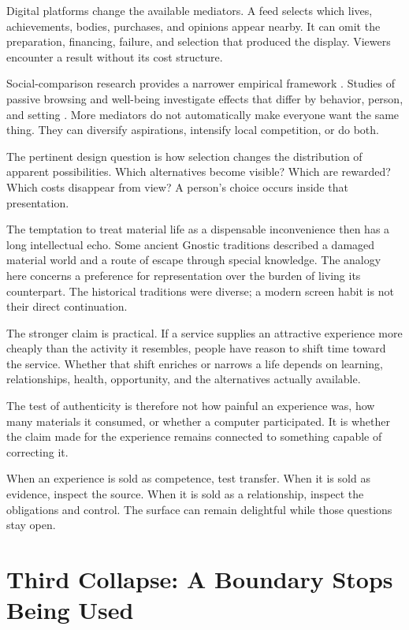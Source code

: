 \documentclass[11pt,openany]{book}
\begin{document}
Digital platforms change the available mediators. A feed selects which lives, achievements, bodies, purchases, and opinions appear nearby. It can omit the preparation, financing, failure, and selection that produced the display. Viewers encounter a result without its cost structure.

Social-comparison research provides a narrower empirical framework \cite{festinger1954theory}. Studies of passive browsing and well-being investigate effects that differ by behavior, person, and setting \cite{verduyn2015passive}. More mediators do not automatically make everyone want the same thing. They can diversify aspirations, intensify local competition, or do both.

The pertinent design question is how selection changes the distribution of apparent possibilities. Which alternatives become visible? Which are rewarded? Which costs disappear from view? A person's choice occurs inside that presentation.

The temptation to treat material life as a dispensable inconvenience then has a long intellectual echo. Some ancient Gnostic traditions described a damaged material world and a route of escape through special knowledge. The analogy here concerns a preference for representation over the burden of living its counterpart. The historical traditions were diverse; a modern screen habit is not their direct continuation.

The stronger claim is practical. If a service supplies an attractive experience more cheaply than the activity it resembles, people have reason to shift time toward the service. Whether that shift enriches or narrows a life depends on learning, relationships, health, opportunity, and the alternatives actually available.

The test of authenticity is therefore not how painful an experience was, how many materials it consumed, or whether a computer participated. It is whether the claim made for the experience remains connected to something capable of correcting it.

When an experience is sold as competence, test transfer. When it is sold as evidence, inspect the source. When it is sold as a relationship, inspect the obligations and control. The surface can remain delightful while those questions stay open.

\section{Third Collapse: A Boundary Stops Being Used}
\end{document}
